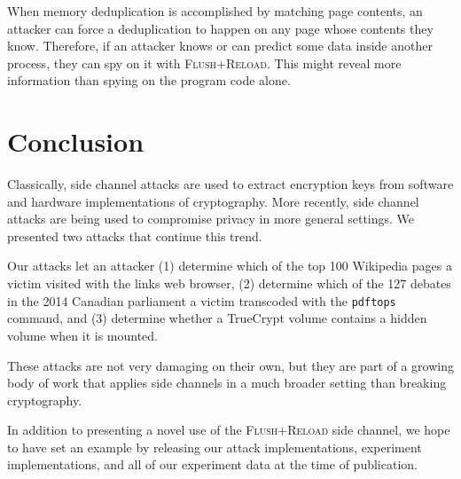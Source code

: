 \documentclass[letterpaper,twocolumn,10pt]{article}
\begin{document}
When memory deduplication is accomplished by matching page contents, an attacker
can force a deduplication to happen on any page whose contents they know.
Therefore, if an attacker knows or can predict some data inside another process,
they can spy on it with \textsc{Flush+Reload}. This might reveal more
information than spying on the program code alone.

\section{Conclusion}
\label{sec:conclusion}

Classically, side channel attacks are used to extract encryption keys from
software and hardware implementations of cryptography. More recently, side
channel attacks are being used to compromise privacy in more general settings.
We presented two attacks that continue this trend. 

Our attacks let an attacker (1) determine which of the top 100 Wikipedia pages
a victim visited with the links web browser, (2) determine which of the 127
debates in the 2014 Canadian parliament a victim transcoded with the
\texttt{pdftops} command, and (3) determine whether a TrueCrypt volume contains
a hidden volume when it is mounted.

These attacks are not very damaging on their own, but they are part of a growing
body of work that applies side channels in a much broader setting than breaking
cryptography. 

In addition to presenting a novel use of the \textsc{Flush+Reload} side channel,
we hope to have set an example by releasing our attack implementations,
experiment implementations, and all of our experiment data at the time of
publication.

{\footnotesize 
}

\theendnotes
\end{document}
